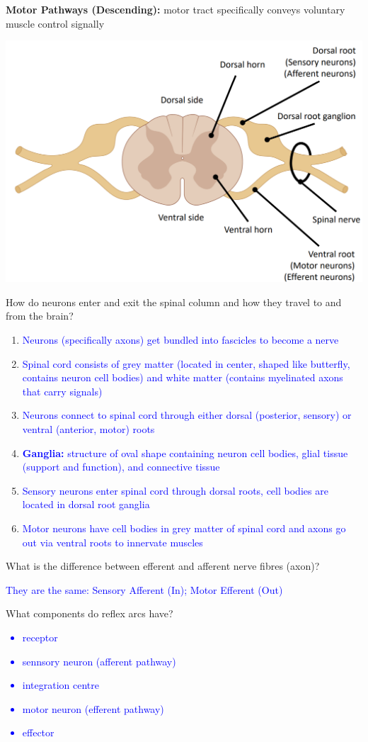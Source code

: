 \documentclass[11pt,fleqn]{book} %
\begin{document}
\textbf{Motor Pathways (Descending):} motor tract specifically conveys voluntary muscle control signally
\begin{center}
    \includegraphics[width=0.65\linewidth]{Pictures/Screenshot 2024-03-06 201615.png}
\end{center}
\begin{exercise}
    How do neurons enter and exit the spinal column and how they travel to and from the brain?
    \begin{enumerate}
        \item \textcolor{blue}{Neurons (specifically axons) get bundled into fascicles to become a nerve} 
        \item \textcolor{blue}{Spinal cord consists of grey matter (located in center, shaped like butterfly, contains neuron cell bodies) and white matter (contains myelinated axons that carry signals)}
        \item \textcolor{blue}{Neurons connect to spinal cord through either dorsal (posterior, sensory) or ventral (anterior, motor) roots}
        \item \textcolor{blue}{\textbf{Ganglia:} structure of oval shape containing neuron cell bodies, glial tissue (support and function), and connective tissue}
        \item \textcolor{blue}{Sensory neurons enter spinal cord through dorsal roots, cell bodies are located in dorsal root ganglia}
        \item \textcolor{blue}{Motor neurons have cell bodies in grey matter of spinal cord and axons go out via ventral roots to innervate muscles}
    \end{enumerate}
\end{exercise}
\begin{exercise}
    What is the difference between efferent and afferent nerve fibres (axon)?

    \textcolor{blue}{They are the same: Sensory Afferent (In); Motor Efferent (Out)}
\end{exercise}
\begin{exercise}
    What components do reflex arcs have?
    \textcolor{blue}{
    \begin{itemize}
        \item receptor
        \item sennsory neuron (afferent pathway)
        \item integration centre
        \item motor neuron (efferent pathway)
        \item effector
    \end{itemize}
    }
\end{exercise}
\end{document}
